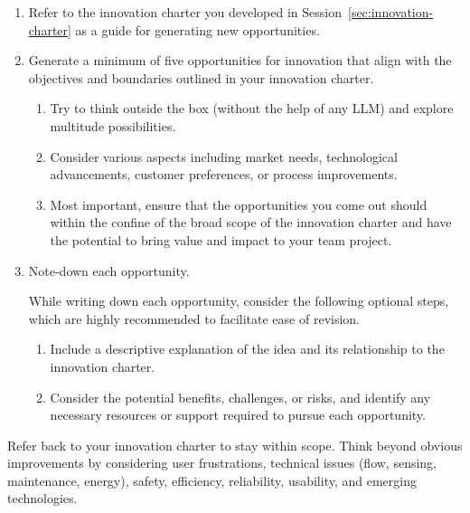 \begin{enumerate}
    \item Refer to the innovation charter you developed in Session~\ref{sec:innovation-charter} as a guide for generating new opportunities.
    \item Generate a minimum of five opportunities for innovation that align with the objectives and boundaries outlined in your innovation charter.
    \begin{enumerate}
        \item Try to think outside the box (without the help of any LLM) and explore multitude possibilities.
        \item Consider various aspects including market needs, technological advancements, customer preferences, or process improvements.
        \item Most important, ensure that the opportunities you come out should within the confine of the broad scope of the innovation charter and have the potential to bring value and impact to your team project.
    \end{enumerate}
    \item Note-down each opportunity.

    While writing down each opportunity, consider the following optional steps, which are highly recommended to facilitate ease of revision.
    \begin{enumerate}
        \item Include a descriptive explanation of the idea and its relationship to the innovation charter.
        \item Consider the potential benefits, challenges, or risks, and identify any necessary resources or support required to pursue each opportunity.
    \end{enumerate}
\end{enumerate}

\begin{tcolorbox}[title=Hint]
Refer back to your innovation charter to stay within scope. Think beyond obvious improvements by considering user frustrations, technical issues (flow, sensing, maintenance, energy), safety, efficiency, reliability, usability, and emerging technologies.
\end{tcolorbox}

